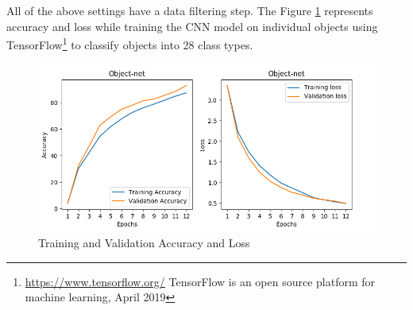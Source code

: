 All of the above settings have a data filtering step. The Figure \ref{fig:accloss} represents accuracy and loss while training the CNN model
on individual objects
using TensorFlow\footnote{\url{https://www.tensorflow.org/} TensorFlow is an open source platform
for machine learning, April 2019} to classify objects into 28 class types.




\begin{figure}[htp]
\begin{center}
        \includegraphics[scale=0.42]{images/accuracy-loss.png}
        \caption{Training and Validation Accuracy and Loss}
        \label{fig:accloss}
\end{center}
\end{figure}







